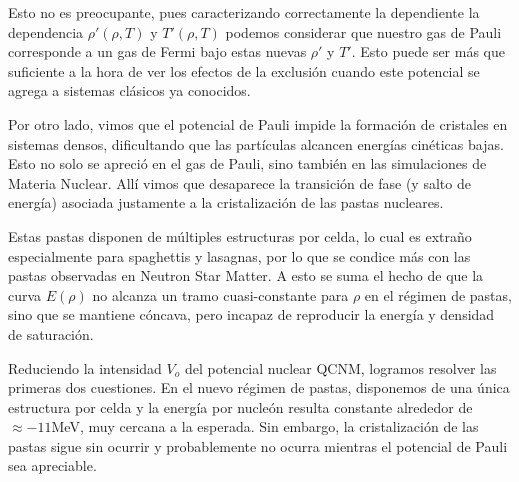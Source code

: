 Esto no es preocupante, pues caracterizando correctamente la dependiente la dependencia $\rho'(\rho, T)$ y $T'(\rho, T)$ podemos considerar que nuestro gas de Pauli corresponde a un gas de Fermi bajo estas nuevas $\rho'$ y $T'$.
Esto puede ser más que suficiente a la hora de ver los efectos de la exclusión cuando este potencial se agrega a sistemas clásicos ya conocidos.

Por otro lado, vimos que el potencial de Pauli impide la formación de cristales en sistemas densos, dificultando que las partículas alcancen energías cinéticas bajas.
Esto no solo se apreció en el gas de Pauli, sino también en las simulaciones de Materia Nuclear.
Allí vimos que desaparece la transición de fase (y salto de energía) asociada justamente a la cristalización de las pastas nucleares.

Estas pastas disponen de múltiples estructuras por celda, lo cual es extraño especialmente para spaghettis y lasagnas, por lo que se condice más con las pastas observadas en Neutron Star Matter.
A esto se suma el hecho de que la curva $E(\rho)$ no alcanza un tramo cuasi-constante para $\rho$ en el régimen de pastas, sino que se mantiene cóncava, pero incapaz de reproducir la energía y densidad de saturación.

Reduciendo la intensidad $V_o$ del potencial nuclear QCNM, logramos resolver las primeras dos cuestiones.
En el nuevo régimen de pastas, disponemos de una única estructura por celda y la energía por nucleón resulta constante alrededor de $\approx -11$MeV, muy cercana a la esperada.
Sin embargo, la cristalización de las pastas sigue sin ocurrir y probablemente no ocurra mientras el potencial de Pauli sea apreciable.
